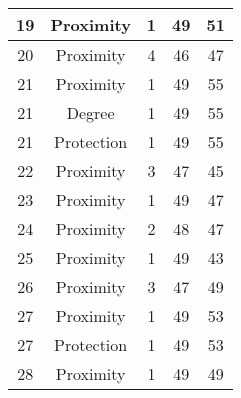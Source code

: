 \documentclass[results.tex]{subfiles}
\begin{document}
\begin{center}
\begin{tabular}{| c || c | c | c | c |}
            \hline
            19                      & Proximity                    & 1                      & 49                      & 51                   \\
            \hline
            20                      & Proximity                    & 4                      & 46                      & 47                   \\
            \hline
            21                      & Proximity                    & 1                      & 49                      & 55                   \\
            \hline
            21                      & Degree                       & 1                      & 49                      & 55                   \\
            \hline
            21                      & Protection                   & 1                      & 49                      & 55                   \\
            \hline
            22                      & Proximity                    & 3                      & 47                      & 45                   \\
            \hline
            23                      & Proximity                    & 1                      & 49                      & 47                   \\
            \hline
            24                      & Proximity                    & 2                      & 48                      & 47                   \\
            \hline
            25                      & Proximity                    & 1                      & 49                      & 43                   \\
            \hline
            26                      & Proximity                    & 3                      & 47                      & 49                   \\
            \hline
            27                      & Proximity                    & 1                      & 49                      & 53                   \\
            \hline
            27                      & Protection                   & 1                      & 49                      & 53                   \\
            \hline
            28                      & Proximity                    & 1                      & 49                      & 49                   \\

\end{tabular}
\end{center}
\end{document}
